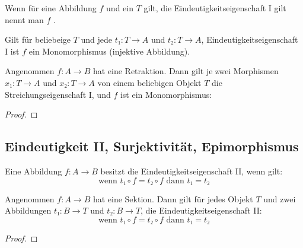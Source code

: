 \documentclass[parskip=half]{scrreprt}
\begin{document}
\begin{definition}
Wenn für eine Abbildung $f$ und ein $T$ gilt, 
die Eindeutigkeitseigenschaft I gilt nennt man $f$
.
\end{definition}

\begin{definition}[Monomorphimus]
Gilt für beliebeige $T$ und jede $t₁: T → A$ und $t₂: T → A$,
Eindeutigkeitseigenschaft I ist $f$ ein Monomorphismus (injektive Abbildung).
\end{definition}

\begin{theorem}\label{th:RetractionImpliesCancellation1}
Angenommen $f: A → B$ hat eine Retraktion.
Dann gilt je zwei Morphismen $x₁: T → A$ und $x₂: T → A$ von einem beliebigen 
Objekt $T$ die Streichungseigenschaft I, und $f$ ist ein Monomorphismus:

\end{theorem}
\begin{proof}
\end{proof}


\newpage
\subsection{Eindeutigkeit II, Surjektivität, Epimorphismus}

\begin{definition}[Eindeutigkeitseigenschaft II]
Eine Abbildung $f: A → B$ besitzt die Eindeutigkeitseigenschaft II, wenn gilt:
$$\text{wenn\ } t₁ ∘ f = t₂ ∘ f \text{\ dann\ } t₁=t₂$$

\end{definition}

\begin{theorem}
Angenommen $f: A → B$ hat eine Sektion. Dann gilt für jedes Objekt $T$ und 
zwei Abbildungen $t₁: B → T$ und $t₂: B → T$, die Eindeutigkeitseigenschaft II:
$$\text{wenn\ } t₁ ∘ f = t₂ ∘ f \text{\ dann\ } t₁=t₂$$

\end{theorem}
\begin{proof}
\end{proof}
\end{document}
